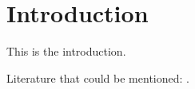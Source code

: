 \section{Introduction}
\label{sec:introduction}

This is the introduction.

Literature that could be mentioned: \cite{kasper2012oobayesnetworks, grappiolo2019growing, xie2017driving, schlechtriemen2015lanechange, sivaraman2013looking}.
